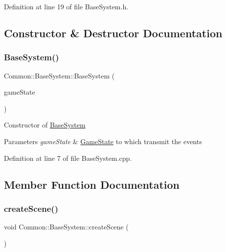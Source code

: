 Definition at line 19 of file Base\+System.\+h.



\subsection{Constructor \& Destructor Documentation}
\mbox{\label{class_common_1_1_base_system_a420a9f2bb9ccec58af8de74cfc71a9fd}} 
\subsubsection{\texorpdfstring{Base\+System()}{BaseSystem()}}
{\footnotesize\ttfamily Common\+::\+Base\+System\+::\+Base\+System (\begin{DoxyParamCaption}\item[{\hyperlink{class_common_1_1_game_state}{Game\+State} $\ast$}]{game\+State }\end{DoxyParamCaption})}

Constructor of \hyperlink{class_common_1_1_base_system}{Base\+System} 
\begin{DoxyParams}{Parameters}
{\em game\+State} & \hyperlink{class_common_1_1_game_state}{Game\+State} to which transmit the events \\
\hline
\end{DoxyParams}


Definition at line 7 of file Base\+System.\+cpp.



\subsection{Member Function Documentation}
\mbox{\label{class_common_1_1_base_system_a1f26fc7376152a90de585fd50c396427}} 
\subsubsection{\texorpdfstring{create\+Scene()}{createScene()}}
{\footnotesize\ttfamily void Common\+::\+Base\+System\+::create\+Scene (\begin{DoxyParamCaption}\item[{void}]{ }\end{DoxyParamCaption})\hspace{0.3cm}{\ttfamily [virtual]}}

